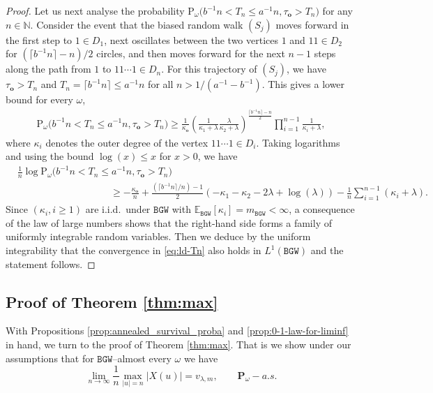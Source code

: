 \documentclass[11 pt]{article}
\theoremstyle{definition}
\numberwithin{equation}{section}
\newcommand{\NN}{\mathbb{N}}
\newcommand{\rt}{\mathbf{o}} %
\newcommand{\Pw}{\mathbf{P}_{\omega}} %
\newcommand{\Pws}{\mathrm{P}_{\omega}} %
\begin{document}
\begin{proof}
	Let us next analyse the probability $\Pws\big( b^{-1} n< T_{n } \le a^{-1} n, \tau_\rt >T_{n}  \big)$ for any $n\in \NN$.  
	Consider the event that the biased random walk $(S_j)$ moves forward in the first step to $1\in D_1$, next oscillates between the two vertices $1$ and $11\in D_{2}$ for $(\lceil b^{-1}  n\rceil -n)/2$ circles, and then moves forward for the next $n-1$ steps along the path from $1$ to $11\cdots 1\in D_n$. 
	For this trajectory of $(S_j)$, we have $\tau_\rt >T_{n}$ and $T_n =\lceil b^{-1}  n\rceil \le a^{-1} n$ for all $n>1/(a^{-1} -b^{-1} )$.  
	This gives a lower bound for every $\omega$,
	\begin{align*}
	\Pws\big( b^{-1}n< T_{n } \le a^{-1} n, \tau_\rt >T_{n}  \big) \geq \frac{1}{\kappa_{\rt}} \left( \frac{1}{\kappa_1 + \lambda} \frac{\lambda}{\kappa_2 + \lambda}\right)^{\frac{\lceil b^{-1}  n\rceil -n}{2}}  \prod_{i=1}^{n-1}\frac{1}{\kappa_i + \lambda},
	\end{align*}
	where $\kappa_{i}$ denotes the outer degree of the vertex $11\cdots 1\in D_i$. 
	Taking logarithms and using the bound $\log(x) \leq x$ for $x > 0$, we have
	\begin{align*}
	&\frac{1}{n} \log \Pws\big( b^{-1}n< T_{n } \le a^{-1} n, \tau_\rt >T_{n}  \big)\\ 
	& \hspace{4cm}  \geq -\frac{\kappa_{\rt}}{n} + \frac{(\lceil b^{-1}  n\rceil/n)-1}{2} \left( -\kappa_1 -\kappa_2- 2\lambda+\log(\lambda)\right)- \frac{1}{n}\sum_{i=1}^{n-1}(\kappa_i + \lambda).
	\end{align*}
Since $(\kappa_{i}, i\ge 1)$ are i.i.d.\ under $\mathtt{BGW}$ with $\mathbb{E}_{\mathtt{BGW}} [\kappa_{i}]= m_{\mathtt{BGW}}<\infty$,  a consequence of the law of large numbers shows that the right-hand side forms a family of uniformly integrable random variables.  
	Then we deduce by the uniform integrability that  the convergence in \eqref{eq:ld-Tn}  also holds in $L^1(\mathtt{BGW})$ and the statement follows. 
\end{proof}





\subsection{Proof of Theorem \ref{thm:max}}\label{sec:main_thms_proofs}

With Propositions \ref{prop:annealed_survival_proba} and \ref{prop:0-1-law-for-liminf} in hand, we turn to the proof of Theorem \ref{thm:max}. That is we show under our assumptions that for $\mathtt{BGW}$--almost every $\omega$ we have
\begin{equation*}
	\lim_{n\to \infty} \frac{1}{n} \max_{|u|=n} |X(u)|  =  v_{\lambda, m}, \qquad \Pw-a.s. 
\end{equation*}
\end{document}
